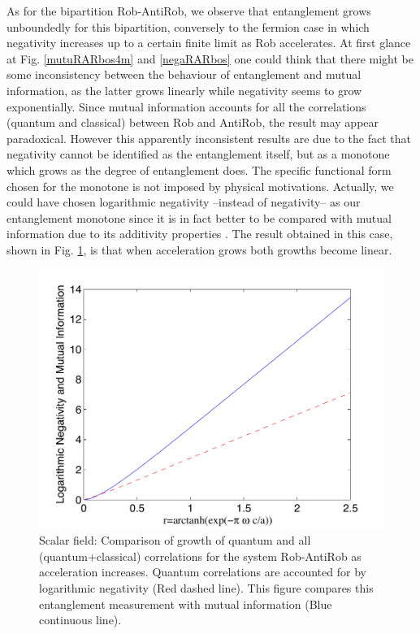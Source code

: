 As for the bipartition Rob-AntiRob, we observe that entanglement grows unboundedly for this bipartition, conversely to the fermion case in which negativity increases up to a certain finite limit as Rob accelerates.  At first glance at Fig. \ref{mutuRARbos4m} and \ref{negaRARbos} one could think that there might be some inconsistency between the behaviour of entanglement and mutual information, as the latter grows linearly while negativity seems to grow exponentially. Since mutual information accounts for all the correlations (quantum and classical) between Rob and AntiRob, the result may appear paradoxical. However this apparently inconsistent results are due to the fact that negativity cannot be identified as the entanglement itself, but as a monotone which grows as the degree of entanglement does.  The specific functional form chosen for the monotone is not imposed by physical motivations. Actually, we could have chosen logarithmic negativity  --instead of negativity-- as our entanglement monotone since it is in fact better to be compared with mutual information due to its additivity properties \cite{logneg}. The result obtained in this case, shown in Fig. \ref{logneg2}, is that when acceleration grows both growths become linear.
\begin{figure}[h]
\begin{center}
\includegraphics[width=.85\textwidth]{lognegMIRAR}
\caption{Scalar field: Comparison of growth of quantum and all (quantum+classical) correlations for the system Rob-AntiRob as acceleration increases. Quantum correlations are accounted for by logarithmic negativity (Red dashed line). This figure compares this entanglement measurement with mutual information (Blue continuous line).}
\label{logneg2}
\end{center}
\end{figure}


